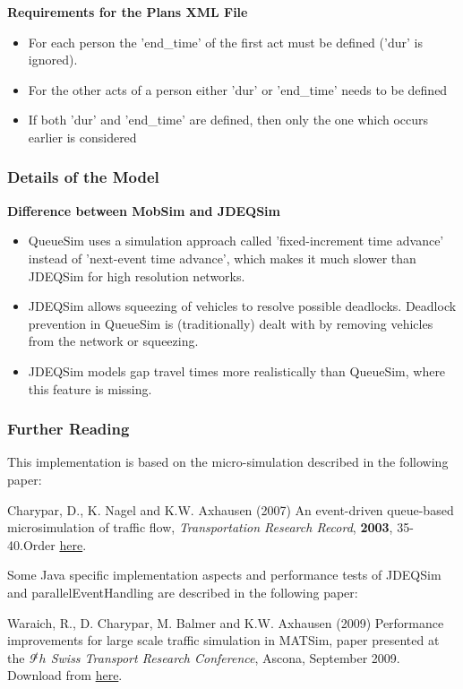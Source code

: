 \documentclass[a4paper,11pt]{report}
\begin{document}
\textbf{Requirements for the Plans XML File
\\}
\begin{itemize}
	\item For each person the 'end\_time' of the first act must be defined ('dur' is ignored).
	\item For the other acts of a person either 'dur' or 'end\_time' needs to be defined
	\item If both 'dur' and 'end\_time' are defined, then only the one which occurs earlier is considered
\end{itemize}

\subsubsection{Details of the Model}

\textbf{Difference between MobSim and JDEQSim}
\begin{itemize}
	\item QueueSim  uses a simulation approach called 'fixed-increment time advance'  instead of 'next-event time advance', which makes it much slower than  JDEQSim for high resolution networks.
	\item JDEQSim allows  squeezing of vehicles to resolve possible deadlocks. Deadlock prevention  in QueueSim is (traditionally) dealt with by removing vehicles from the  network or squeezing.
	\item JDEQSim models gap travel times more realistically than QueueSim, where this feature is missing.
\end{itemize}




\subsubsection{Further Reading}

This implementation is based on the micro-simulation described in the following paper:

Charypar, D., K. Nagel and K.W. Axhausen (2007) An event-driven queue-based microsimulation of traffic flow, \emph{Transportation Research Record}, \textbf{2003}, 35-40.Order \href{http://trb.metapress.com/content/j2118065485r4611/?p=4f63e25a261d48d99eeebea19b494e24&amp;pi=0}{here}.

Some  Java specific implementation aspects and performance tests of JDEQSim  and parallelEventHandling are described in the following paper:

Waraich,  R., D. Charypar, M. Balmer and K.W. Axhausen (2009) Performance  improvements for large scale traffic simulation in MATSim, paper  presented at the \emph{9$^th$ Swiss Transport Research Conference}, Ascona, September 2009. Download from \href{http://www.ivt.ethz.ch/vpl/publications/reports/ab565.pdf}{here}.
\end{document}
